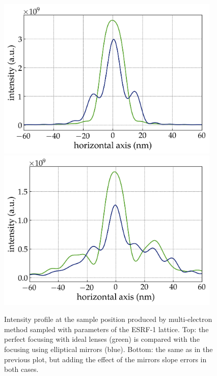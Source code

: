 \documentclass{iucr}              %
\begin{document}
\begin{figure}
    \centering
        \includegraphics[width=0.95\textwidth]{GRAPHICS/ESRF_ideal.png}
        \includegraphics[width=0.95\textwidth]{GRAPHICS/ESRF_real.png}
    \label{fig:FiniteEmittanceA}
    \caption{
    Intensity profile at the sample position produced by multi-electron method sampled with parameters of the ESRF-1 lattice. Top: the perfect focusing with ideal lenses (green) is compared with the focusing using elliptical mirrors (blue). Bottom: the same as in the previous plot, but adding the effect of the mirrors slope errors in both cases.
    }
\end{figure}
\end{document}

